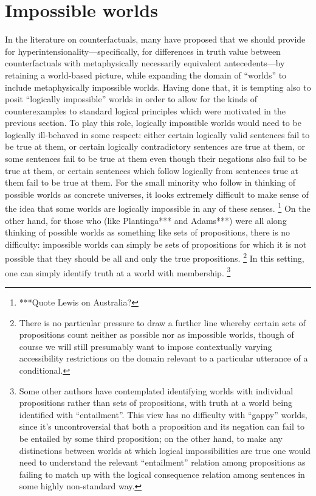 \documentclass[If.tex]{subfiles}
\begin{document}
\section{Impossible worlds}  
\label{sect:impossibleworlds}
In the literature on counterfactuals, many have proposed that we should provide for hyperintensionality---specifically, for differences in truth value between counterfactuals with metaphysically necessarily equivalent antecedents---by retaining a world-based picture, while expanding the domain of “worlds” to include metaphysically impossible worlds.  Having done that, it is tempting also to posit “logically impossible” worlds in order to allow for the kinds of counterexamples to standard logical principles which were motivated in the previous section.  To play this role, logically impossible worlds would need to be logically ill-behaved in some respect: either certain logically valid sentences fail to be true at them, or certain logically contradictory sentences are true at them, or some sentences fail to be true at them even though their negations also fail to be true at them, or certain sentences which follow logically from sentences true at them fail to be true at them.  For the small minority who follow \citet{LewisOPW} in thinking of possible worlds as concrete universes, it looks extremely difficult to make sense of the idea that some worlds are logically impossible in any of these senses.%
\footnote{***Quote Lewis on Australia?}
On the other hand, for those who (like Plantinga*** and Adams***) were all along thinking of possible worlds as something like sets of propositions, there is no difficulty: impossible worlds can simply be sets of propositions for which it is not possible that they should be all and only the true propositions.%
\footnote{There is no particular pressure to draw a further line whereby certain sets of propositions count neither as possible nor as impossible worlds, though of course we will still presumably want to impose contextually varying accessibility restrictions on the domain relevant to a particular utterance of a conditional.}  
In this setting, one can simply identify truth at a world with membership.%
\footnote{Some other authors have contemplated identifying worlds with individual propositions rather than sets of propositions, with truth at a world being identified with “entailment”.  This view has no difficulty with “gappy” worlds, since it's uncontroversial that both a proposition and its negation can fail to be entailed by some third proposition; on the other hand, to make any distinctions between worlds at which logical impossibilities are true one would need to understand the relevant “entailment” relation among propositions as failing to match up with the logical consequence relation among sentences in some highly non-standard way.}
\end{document}
